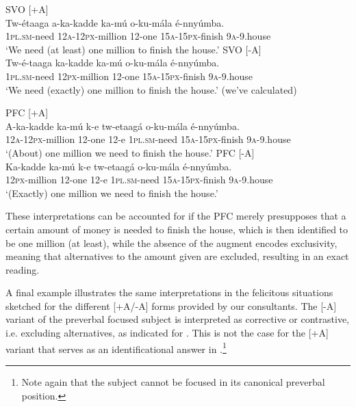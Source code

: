 \documentclass[output=paper]{langsci/langscibook}
\begin{document}
\ea\label{ex:vanderwal:40}
\ea\label{ex:vanderwal:40a}    {SVO [+A]}\\
\gll   Tw-étaaga  a-ka-kadde    ka-mú  o-ku-mála    é-nnyúmba.\\
       \textsc{1pl}.\textsc{sm}-need  \textsc{12a}-\textsc{12px}-million  12-one  \textsc{15a}-\textsc{15px}-finish  \textsc{9a}-9.house\\
\glt   ‘We need (at least) one million to finish the house.’
\ex \label{ex:vanderwal:40b}
 SVO [-A]\\
\gll Tw-é-taaga  ka-kadde  ka-mú  o-ku-mála    é-nnyúmba.\\
     \textsc{1pl}.\textsc{sm}-need  \textsc{12px}-million  12-one  \textsc{15a}-\textsc{15px}-finish  \textsc{9a}-9.house\\
\glt ‘We need (exactly) one million to finish the house.’ (we’ve calculated)
\z
\z

\ea\label{ex:vanderwal:41}
\ea\label{ex:vanderwal:41a}PFC [+A]\\
\gll A-ka-kadde  ka-mú  k-e  tw-etaagá  o-ku-mála    é-nnyúmba.\\
     \textsc{12a}-\textsc{12px}-million  12-one  12-e  \textsc{1pl}.\textsc{sm}-need  \textsc{15a}-\textsc{15px}-finish  \textsc{9a}-9.house\\
\glt ‘(About) one million we need to finish the house.’
\ex \label{ex:vanderwal:41b}
  PFC [-A]\\
\gll Ka-kadde    ka-mú  k-e  tw-etaagá  o-ku-mála    é-nnyúmba.\\
     \textsc{12px}-million  12-one  12-e  \textsc{1pl}.\textsc{sm}-need  \textsc{15a}-\textsc{15px}-finish  \textsc{9a}-9.house\\
\glt ‘(Exactly) one million we need to finish the house.’
\z
\z

These interpretations can be accounted for if the PFC merely presupposes that a certain amount of money is needed to finish the house, which is then identified to be one million (at least), while the absence of the augment encodes exclusivity, meaning that alternatives to the amount given are excluded, resulting in an exact reading.

A final example illustrates the same interpretations in the felicitous situations sketched for the different [+A/-A] forms provided by our consultants. The [-A] variant of the preverbal focused subject is interpreted as corrective or contrastive, i.e. excluding alternatives, as indicated for . This is not the case for the [+A] variant that serves as an identificational answer in .\footnote{Note again that the subject cannot be focused in its canonical preverbal position.}
\end{document}
